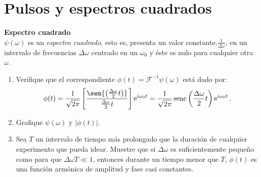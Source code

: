 \section*{Pulsos y espectros cuadrados}

\item
\textbf{Espectro cuadrado}\\ 
\(\psi(\omega)\) es un \emph{espectro cuadrado}, esto es, presenta un valor constante,$\frac{1}{\Delta \omega}$, en un intervalo de frecuencias $\Delta\omega$ centrado en un $\omega_0$ y éste es nulo para cualquier otra $\omega$.
\begin{enumerate}
	\item
	Verifique que el correspondiente $\phi(t) = \mathcal{F}^{-1} \psi(\omega)$ está dado por:
	$$
		\phi(t)
		= \frac{1}{\sqrt{2 \pi}} \left[ \frac{ \sen{ \left( \frac{\Delta \omega}{2} t \right) } }{\frac{\Delta \omega}{2} t} \right] \operatorname{e}^{i \omega_0 t}
		= \frac{1}{\sqrt{2 \pi}} \operatorname{senc} \left( \frac{\Delta \omega}{2} t \right) \operatorname{e}^{i \omega_0 t}.
	$$
	\item
	Grafique $\psi(\omega)$ y $\left|\phi(t)\right|$.
	\item 
	Sea $T$ un intervalo de tiempo más prolongado que la duración de cualquier experimento que pueda idear.
	Muestre que si $\Delta\omega$ es suficientemente pequeño como para que $\Delta\omega T\ll1$, entonces durante un tiempo menor que $T$, $\phi(t)$ es una función armónica de amplitud y fase casi constantes.
\end{enumerate}



